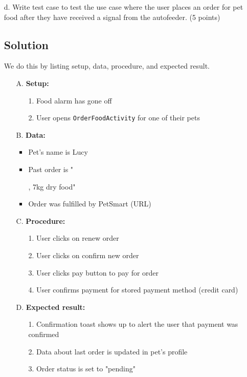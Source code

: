 \documentclass[12pt]{book}
\begin{document}
\begin{itemize}
    \item[d.] Write test case to test the use case where the user places an order for pet food after they have received a signal from the autofeeder. (5 points)
    
    \subsection*{Solution}
    We do this by listing setup, data, procedure, and expected result.

    \begin{itemize}
        \item[A.] \textbf{Setup:} \begin{itemize}
            \item[1.] Food alarm has gone off
            \item[2.] User opens \texttt{OrderFoodActivity} for one of their pets
        \end{itemize}

        \item[B.] \textbf{Data:} \begin{itemize}
            \item Pet's name is Lucy
            \item Past order is "\date{2023-02-15}, 7kg dry food"
            \item Order was fulfilled by PetSmart (URL)
        \end{itemize}

        \item[C.] \textbf{Procedure:} \begin{itemize}
            \item[1.] User clicks on renew order
            \item[2.] User clicks on confirm new order
            \item[3.] User clicks pay button to pay for order
            \item[4.] User confirms payment for stored payment method (credit card)
        \end{itemize}

        \item[D.] \textbf{Expected result:} \begin{itemize}
            \item[1.] Confirmation toast shows up to alert the user that payment was confirmed
            \item[2.] Data about last order is updated in pet's profile
            \item[3.] Order status is set to "pending"
        \end{itemize} 
    \end{itemize}


\end{itemize}
\end{document}
